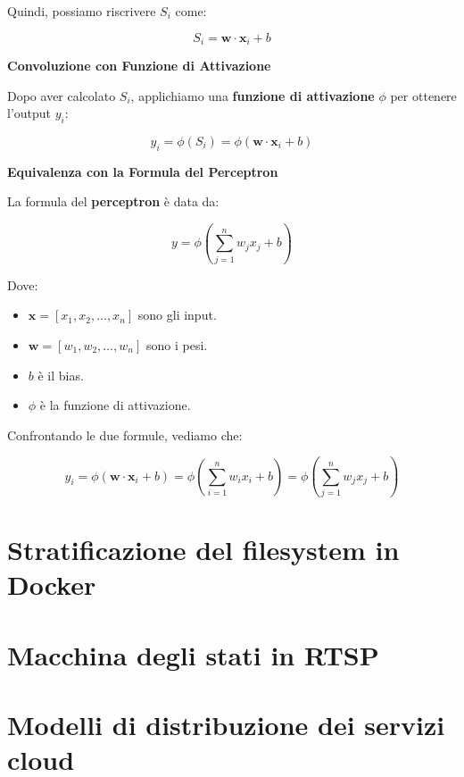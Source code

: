 Quindi, possiamo riscrivere \( S_i \) come:

\[
S_i = \mathbf{w} \cdot \mathbf{x}_i + b
\]

\noindent\textbf{Convoluzione con Funzione di Attivazione}

\vspace{0.5em} %

\noindent Dopo aver calcolato \( S_i \), applichiamo una \textbf{funzione di attivazione} \( \phi \) per ottenere l'output \( y_i \):

\[
y_i = \phi(S_i) = \phi\left(\mathbf{w} \cdot \mathbf{x}_i + b\right)
\]

\noindent\textbf{Equivalenza con la Formula del Perceptron}

\vspace{0.5em} %

\noindent La formula del \textbf{perceptron} è data da:

\[
y = \phi\left(\sum_{j=1}^{n} w_j x_j + b\right)
\]

Dove:
\begin{itemize}
    \item \( \mathbf{x} = [x_1, x_2, \dots, x_n] \) sono gli input.
    \item \( \mathbf{w} = [w_1, w_2, \dots, w_n] \) sono i pesi.
    \item \( b \) è il bias.
    \item \( \phi \) è la funzione di attivazione.
\end{itemize}

\noindent Confrontando le due formule, vediamo che:

\[
y_i = \phi\left(\mathbf{w} \cdot \mathbf{x}_i + b\right) = \phi\left(\sum_{i=1}^{n} w_i x_i + b\right) = \phi\left(\sum_{j=1}^{n} w_j x_j + b\right)
\]

\section*{Stratificazione del filesystem in Docker}
\section*{Macchina degli stati in RTSP}
\section*{Modelli di distribuzione dei servizi cloud}


